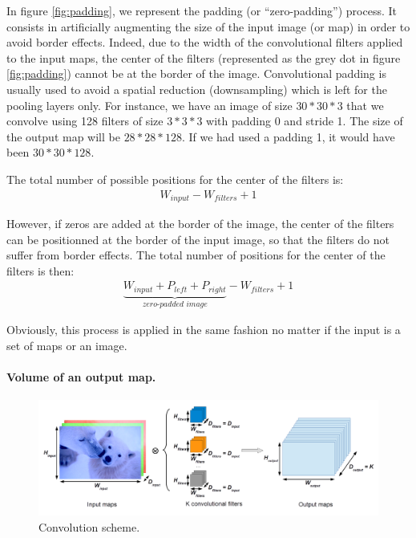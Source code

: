 In figure \ref{fig:padding}, we represent the padding (or ``zero-padding'') process. It consists in artificially augmenting the size of the input image (or map) in order to avoid border effects. Indeed, due to the width of the convolutional filters applied to the input maps, the center of the filters (represented as the grey dot in figure \ref{fig:padding}) cannot be at the border of the image. 
Convolutional padding is usually used to avoid a spatial reduction (downsampling) which is left for the pooling layers only. For instance, we have an image of size $30*30*3$ that we convolve using 128 filters of size $3*3*3$  with padding 0 and stride 1. The size of the output map will be $28*28*128$. If we had used a padding 1, it would have been $30*30*128$.

The total number of possible positions for the center of the filters is: 
\begin{align}
 W_{input} - W_{filters} + 1 \nonumber
\end{align}

However, if zeros are added at the border of the image, the center of the filters can be positionned at the border of the input image, so that the filters do not suffer from border effects. 
The total number of positions for the center of the filters is then: 
\begin{align}
 \underbrace{W_{input} + P_{left} + P_{right}}_{\textit{zero-padded image}} - W_{filters} + 1 \nonumber
\end{align}

Obviously, this process is applied in the same fashion no matter if the input is a set of maps or an 
image.




\paragraph{Volume of an output map. }

\begin{figure}
 \begin{center}
  \includegraphics[width=16cm]{images/schema_conv.png}
 \end{center}
  \caption{
  \label{fig:conv}Convolution scheme. 
  }
\end{figure}

